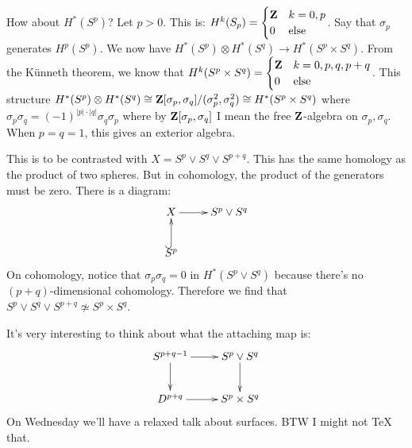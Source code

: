 \begin{example}
How about $ H^\ast(S^p)$? Let $p>0$. This is: $ H^k(S_p) = \begin{cases}\mathbf Z & k=0,p\\ 0 & \text{else}\end{cases}$. Say that $\sigma_p$ generates $ H^p(S^p)$. We now have $ H^\ast(S^p)\otimes H^\ast(S^q)\to H^\ast(S^p\times S^q)$. From the K\"unneth theorem, we know that $ H^k(S^p\times S^q)=\begin{cases}\mathbf Z & k=0,p,q,p+q\\ 0 & \text{else}\end{cases}$. This structure $ H^\ast(S^p)\otimes H^\ast(S^q)\cong\mathbf Z[\sigma_p,\sigma_q]/(\sigma_p^2,\sigma_q^2)\cong H^\ast(S^p\times S^q)$ where $\sigma_p\sigma_q=(-1)^{|p|\cdot|q|}\sigma_q\sigma_p$ where by $\mathbf Z[\sigma_p,\sigma_q]$ I mean the free $\mathbf Z$-algebra on $\sigma_p,\sigma_q$. When $p=q=1$, this gives an exterior algebra.
\end{example}
This is to be contrasted with $X=S^p\vee S^q\vee S^{p+q}$. This has the same homology as the product of two spheres. But in cohomology, the product of the generators must be zero. There is a diagram:
\begin{equation*}
\xymatrix{
	X\ar[r] & S^p\vee S^q\\
	S^p\ar@{^(->}[u]
}
\end{equation*}
On cohomology, notice that $\sigma_p\sigma_q=0$ in $ H^\ast(S^p\vee S^q)$ because there's no $(p+q)$-dimensional cohomology. Therefore we find that $S^p\vee S^q\vee S^{p+q}\not\simeq S^p\times S^q$.

It's very interesting to think about what the attaching map is:
\begin{equation*}
\xymatrix{
	S^{p+q-1}\ar[r]\ar[d] & S^p\vee S^q\ar[d]\\
	D^{p+q}\ar[r] & S^p\times S^q
}
\end{equation*}
On Wednesday we'll have a relaxed talk about surfaces. BTW I might not TeX that.
